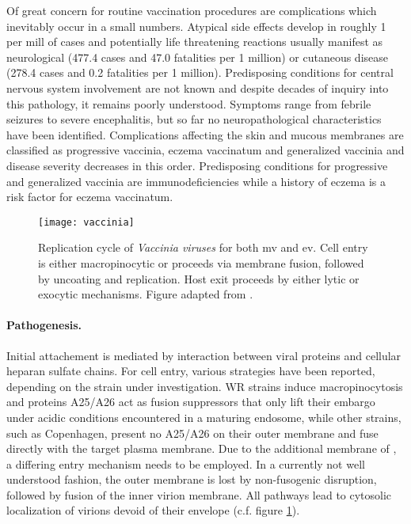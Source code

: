Of great concern for routine vaccination procedures are complications which inevitably occur in a small numbers. Atypical side effects develop in roughly 1 per mill of cases and potentially life threatening reactions usually manifest as neurological (477.4 cases and 47.0 fatalities per 1 million) or cutaneous disease (278.4 cases and 0.2 fatalities per 1 million). Predisposing conditions for central nervous system involvement are not known and despite decades of inquiry into this pathology, it remains poorly understood. Symptoms range from febrile seizures to severe encephalitis, but so far no  neuropathological characteristics have been identified. Complications affecting the skin and mucous membranes are classified as progressive vaccinia, eczema vaccinatum and generalized vaccinia and disease severity decreases in this order. Predisposing conditions for progressive and generalized vaccinia are immunodeficiencies while a history of eczema is a risk factor for eczema vaccinatum.

\begin{figure}[t]
  \centering
  \texttt{[image: vaccinia]}
  \caption[Replication cycle of \textit{Vaccinia viruses} for both intracellular mature and extracellular enveloped virions.]{Replication cycle of \textit{Vaccinia viruses} for both \acrfull{mv} and \acrfull{ev}. Cell entry is either macropinocytic or proceeds via membrane fusion, followed by uncoating and replication. Host exit proceeds by either lytic or exocytic mechanisms. Figure adapted from \citet{Hulo2011}.}
  \label{fig:vaccinia}
\end{figure}

\paragraph{Pathogenesis.}
Initial attachement is mediated by interaction between viral proteins and cellular heparan sulfate chains. For cell entry, various strategies have been reported, depending on the strain under investigation. WR strains induce macropinocytosis and proteins A25\slash A26 act as fusion suppressors that only lift their embargo under acidic conditions encountered in a maturing endosome, while other strains, such as Copenhagen, present no A25\slash A26 on their outer membrane and fuse directly with the target plasma membrane. Due to the additional membrane of , a differing entry mechanism needs to be employed. In a currently not well understood fashion, the outer membrane is lost by non-fusogenic disruption, followed by fusion of the inner virion membrane. All pathways lead to cytosolic localization of virions devoid of their envelope (c.f. figure \ref{fig:vaccinia}).

